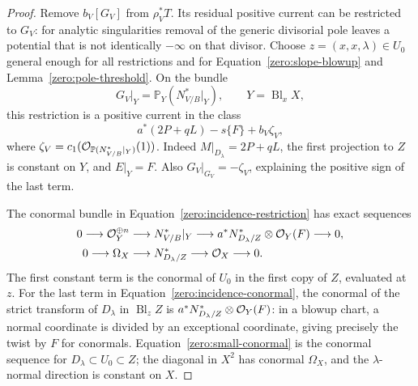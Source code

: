 \begin{proof}
Remove \(b_V[G_V]\) from \(\rho_V^*T\).  Its residual positive current
can be restricted to \(G_V\): for analytic singularities removal of
the generic divisorial pole leaves a potential that is not identically
\(-\infty\) on that divisor.  Choose \(z=(x,x,\lambda)\in U_0\)
general enough for all restrictions and for
Equation~\eqref{zero:slope-blowup} and Lemma~\ref{zero:pole-threshold}.  On the bundle
\[
 G_V|_Y=\mathbb{P}_Y(N^*_{V/B}|_Y),\qquad Y=\operatorname{Bl}_xX,
\]
this restriction is a positive current in the class
\begin{equation}\label{zero:incidence-restriction}
 a^*(2P+qL)-s\{F\}+b_V\zeta_V ,
\end{equation}
where \(\zeta_V=c_1(\mathcal O_{\mathbb{P}(N^*_{V/B}|_Y)}(1))\).
Indeed \(M|_{D_\lambda}=2P+qL\), the first projection to \(Z\) is constant on
\(Y\), and \(E|_Y=F\).  Also \(G_V|_{G_V}=-\zeta_V\), explaining the
positive sign of the last term.

The conormal bundle in Equation~\eqref{zero:incidence-restriction} has exact
sequences
\begin{align}
 0\longrightarrow\mathcal O_Y^{\oplus n}
 &\longrightarrow N^*_{V/B}|_Y
 \longrightarrow a^*N^*_{D_\lambda/Z}\otimes\mathcal O_Y(F)
 \longrightarrow0,\label{zero:incidence-conormal}\\
 0\longrightarrow\Omega_X
 &\longrightarrow N^*_{D_\lambda/Z}
 \longrightarrow\mathcal O_X\longrightarrow0.\label{zero:small-conormal}
\end{align}
The first constant term is the conormal of \(U_0\) in the first copy of
\(Z\), evaluated at \(z\).  For the last term in
Equation~\eqref{zero:incidence-conormal}, the conormal of the strict transform of
\(D_\lambda\) in \(\operatorname{Bl}_zZ\) is
\(a^*N^*_{D_\lambda/Z}\otimes\mathcal O_Y(F)\): in a blowup chart, a normal
coordinate is divided by an exceptional coordinate, giving precisely
the twist by \(F\) for conormals.  Equation~\eqref{zero:small-conormal}
is the conormal sequence for
\(D_\lambda\subset U_0\subset Z\); the diagonal in \(X^2\) has conormal
\(\Omega_X\), and the \(\lambda\)-normal direction is constant on
\(X\).


\end{proof}
